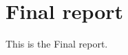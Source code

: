 \documentclass{article}
\newcommand{\thetitle}{Draft}
\renewcommand{\thetitle}{Final report}
\begin{document}
\section{\thetitle}
This is the \thetitle.
\end{document}
